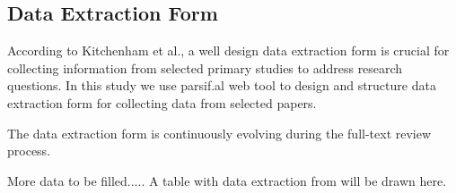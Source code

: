 
\subsection{Data Extraction Form}
According to Kitchenham et al.\cite{kitchenham_guidelines_2007}, a well design data extraction form is crucial for collecting information from selected primary studies to address research questions. In this study we use parsif.al web tool to design and structure data extraction form for collecting data from selected papers.  

The data extraction form is continuously evolving during the full-text review process. 

More data to be filled..... A table with data extraction from will be drawn here. 